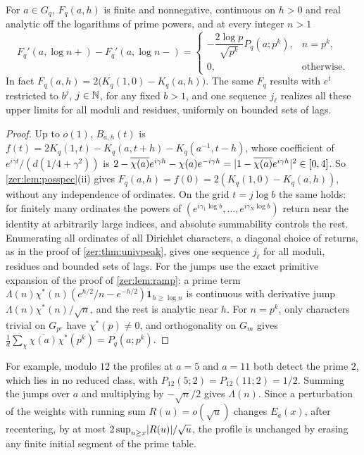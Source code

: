 \begin{theorem}\label{rec:thm:primepower}
For $a\in G_q$, $F_q(a,h)$ is finite and nonnegative, continuous on $h>0$ and real analytic off the
logarithms of prime powers, and at every integer $n>1$
\[
 F_q'(a,\log n+)-F_q'(a,\log n-)=
 \begin{cases}-\dfrac{2\log p}{\sqrt{p^k}}P_q(a;p^k),&n=p^k,\\[3pt]0,&\text{otherwise}.\end{cases}
\]
In fact $F_q(a,h)=2\bigl(K_q(1,0)-K_q(a,h)\bigr)$. The same
$F_q$ results with $e^t$ restricted to $b^j$, $j\in\mathbb{N}$, for any fixed $b>1$, and one sequence $j_\ell$
realizes all these upper limits for all moduli and residues, uniformly on bounded sets of lags.
\end{theorem}

\begin{proof}
Up to $o(1)$, $B_{a,h}(t)$ is $f(t)=2K_q(1,t)-K_q(a,t+h)-K_q(a^{-1},t-h)$, whose coefficient of
$e^{i\gamma t}/(d(1/4+\gamma^2))$ is
$2-\overline{\chi(a)}e^{i\gamma h}-\chi(a)e^{-i\gamma h}=\lvert1-\overline{\chi(a)}e^{i\gamma h}\rvert^2\in[0,4]$.
So \cref{zer:lem:posspec}(ii) gives $F_q(a,h)=f(0)=2(K_q(1,0)-K_q(a,h))$, without any independence of
ordinates. On the grid $t=j\log b$ the same holds: for finitely many ordinates the powers of
$(e^{i\gamma_1\log b},\dots,e^{i\gamma_N\log b})$ return near the identity at arbitrarily large indices,
and absolute summability controls the rest. Enumerating all ordinates of all Dirichlet characters, a
diagonal choice of returns, as in the proof of \cref{zer:thm:univpeak}, gives one sequence $j_\ell$ for all
moduli, residues and bounded sets of lags. For the jumps use
the exact primitive expansion of the proof of \cref{zer:lem:ramp}: a prime term
$\Lambda(n)\chi^*(n)(e^{h/2}/n-e^{-h/2})\mathbf 1_{h\ge\log n}$ is continuous with derivative jump
$\Lambda(n)\chi^*(n)/\sqrt n$, and the rest is analytic near $h$. For $n=p^k$, only characters trivial
on $G_{p^v}$ have $\chi^*(p)\ne0$, and orthogonality on $G_m$ gives
$\frac1d\sum_\chi\overline{\chi(a)}\chi^*(p^k)=P_q(a;p^k)$.
\end{proof}

For example, modulo $12$ the profiles at $a=5$ and $a=11$ both detect the prime $2$, which lies in
no reduced class, with $P_{12}(5;2)=P_{12}(11;2)=1/2$. Summing the jumps over $a$ and multiplying by
$-\sqrt n/2$ gives $\Lambda(n)$. Since a perturbation of the weights with running sum $R(u)=o(\sqrt u)$
changes $E_a(x)$, after recentering, by at most $2\sup_{u\ge x}\lvert R(u)\rvert/\sqrt u$, the profile is
unchanged by erasing any finite initial segment of the prime table.

